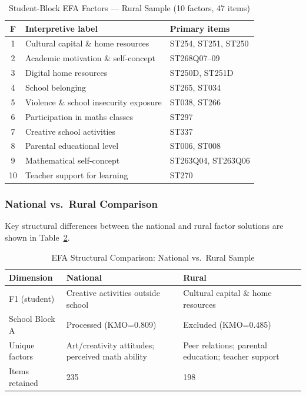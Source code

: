 \documentclass[twocolumn,12pt]{article}
\begin{document}
\begin{table}[htbp]
\centering
\caption{Student-Block EFA Factors --- Rural Sample (10 factors, 47 items)}
\label{tab:efa_factors}
\scriptsize
\begin{tabular}{@{}clp{3.2cm}@{}}
\toprule
\textbf{F} & \textbf{Interpretive label} & \textbf{Primary items} \\
\midrule
1  & Cultural capital \& home resources     & ST254, ST251, ST250 \\
2  & Academic motivation \& self-concept    & ST268Q07--09 \\
3  & Digital home resources                 & ST250D, ST251D \\
4  & School belonging                       & ST265, ST034 \\
5  & Violence \& school insecurity exposure & ST038, ST266 \\
6  & Participation in maths classes         & ST297 \\
7  & Creative school activities             & ST337 \\
8  & Parental educational level             & ST006, ST008 \\
9  & Mathematical self-concept              & ST263Q04, ST263Q06 \\
10 & Teacher support for learning           & ST270 \\
\bottomrule
\end{tabular}
\end{table}


\subsubsection{National vs.\ Rural Comparison}

Key structural differences between the national and rural factor solutions
are shown in Table~\ref{tab:efa_comparison}.

\begin{table}[htbp]
\centering
\caption{EFA Structural Comparison: National vs.\ Rural Sample}
\label{tab:efa_comparison}
\scriptsize
\begin{tabular}{@{}p{2.0cm}p{2.3cm}p{2.3cm}@{}}
\toprule
\textbf{Dimension} & \textbf{National} & \textbf{Rural} \\
\midrule
F1 (student)   & Creative activities outside school & Cultural capital \& home resources \\
School Block A & Processed (KMO=0.809) & Excluded (KMO=0.485) \\
Unique factors & Art/creativity attitudes; perceived math ability &
Peer relations; parental education; teacher support \\
Items retained & 235 & 198 \\
\bottomrule
\end{tabular}
\end{table}
\end{document}
